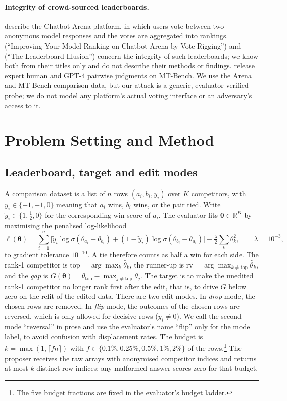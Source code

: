 \documentclass{article}
\newcommand{\ts}{\boldsymbol{\theta}}
\newcommand{\sig}{\sigma}
\begin{document}
\paragraph{Integrity of crowd-sourced leaderboards.}
\citet{Chiang2024Chatbot} describe the Chatbot Arena platform, in which users vote between two anonymous model responses and the votes are aggregated into rankings. \citet{Min2025Rigging} (``Improving Your Model Ranking on Chatbot Arena by Vote Rigging'') and \citet{Singh2025Illusion} (``The Leaderboard Illusion'') concern the integrity of such leaderboards; we know both from their titles only and do not describe their methods or findings. \citet{Zheng2023Judging} release expert human and GPT-4 pairwise judgments on MT-Bench. We use the Arena and MT-Bench comparison data, but our attack is a generic, evaluator-verified probe; we do not model any platform's actual voting interface or an adversary's access to it.

\section{Problem Setting and Method}
\label{sec:method}
\subsection{Leaderboard, target and edit modes}
A comparison dataset is a list of $n$ rows $(a_i,b_i,y_i)$ over $K$ competitors, with $y_i\in\{+1,-1,0\}$ meaning that $a_i$ wins, $b_i$ wins, or the pair tied. Write $\tilde y_i\in\{1,\tfrac12,0\}$ for the corresponding win score of $a_i$. The evaluator fits $\ts\in\mathbb{R}^K$ by maximising the penalised log-likelihood
\begin{equation}
\ell(\ts)=\sum_{i=1}^{n}\Big[\tilde y_i\log\sig(\theta_{a_i}-\theta_{b_i})+(1-\tilde y_i)\log\sig(\theta_{b_i}-\theta_{a_i})\Big]-\tfrac{\lambda}{2}\sum_{k}\theta_k^2,\qquad \lambda=10^{-3},
\label{eq:bt}
\end{equation}
to gradient tolerance $10^{-10}$. A tie therefore counts as half a win for each side. The rank-1 competitor is $\mathrm{top}=\arg\max_k\hat\theta_k$, the runner-up is $\mathrm{rv}=\arg\max_{k\neq \mathrm{top}}\hat\theta_k$, and the \emph{gap} is $G(\ts)=\theta_{\mathrm{top}}-\max_{j\neq \mathrm{top}}\theta_j$. %
The target is to make the unedited rank-1 competitor no longer rank first after the edit, that is, to drive $G$ below zero on the refit of the edited data.
There are two edit modes. In \emph{drop} mode, the chosen rows are removed. In \emph{flip} mode, the outcomes of the chosen rows are reversed, which is only allowed for decisive rows ($y_i\neq 0$). We call the second mode ``reversal'' in prose and use the evaluator's name ``flip'' only for the mode label, to avoid confusion with displacement rates.
The budget is $k=\max(1,\lceil fn\rceil)$ with $f\in\{0.1\%,0.25\%,0.5\%,1\%,2\%\}$ of the rows.\footnote{The five budget fractions are fixed in the evaluator's budget ladder.} %
The proposer receives the raw arrays with anonymised competitor indices and returns at most $k$ distinct row indices; any malformed answer scores zero for that budget.
\end{document}
